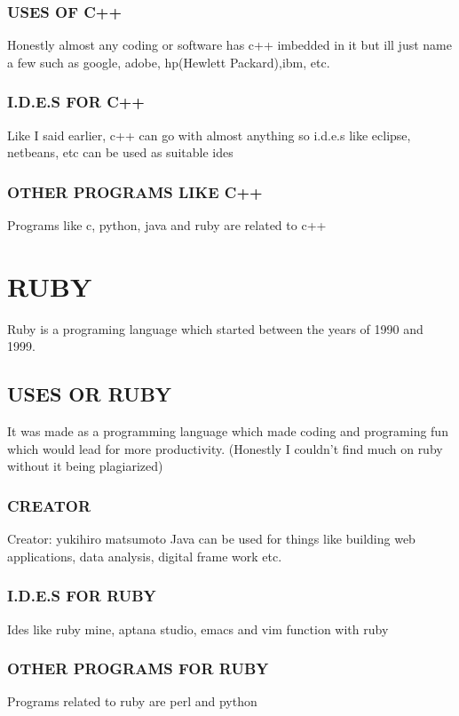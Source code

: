 \documentclass{article}
\begin{document}
		\subsubsection{USES OF C++}
		Honestly almost any coding or software has c++ imbedded in it but ill just name a few such as google, adobe, hp(Hewlett Packard),ibm, etc.
		\subsubsection{I.D.E.S FOR C++}
		Like I said earlier, c++ can go with almost anything so i.d.e.s like eclipse, netbeans, etc can be used as suitable ides
		\subsubsection{OTHER PROGRAMS LIKE C++}
		Programs like c, python, java and ruby are related to c++
			\section{RUBY}
		Ruby is a programing language which started between the years of 1990 and 1999. 
		\subsection{USES OR RUBY}
		It was made as a programming language which made coding and programing fun which would lead for more productivity. (Honestly I couldn’t find much on ruby without it being plagiarized)
		\subsubsection{CREATOR}
		Creator: yukihiro matsumoto
		Java  can be used for things like building web applications, data analysis, digital frame work etc.
		\subsubsection{I.D.E.S FOR RUBY}
		Ides like ruby mine, aptana studio, emacs and vim function with ruby
		\subsubsection{OTHER PROGRAMS FOR RUBY}
		Programs related to ruby are perl and python
		
\end{document}
